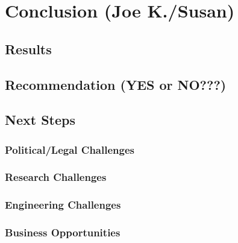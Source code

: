 \chapter{Conclusion (Joe K./Susan)}
\label{chapter:conclusion}

\section{Results}
\section{Recommendation (YES or NO???)}
\section{Next Steps}
\subsection{Political/Legal Challenges}
\subsection{Research Challenges}
\subsection{Engineering Challenges}
\subsection{Business Opportunities}
